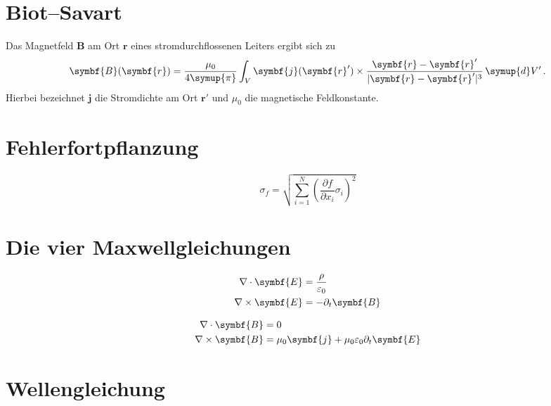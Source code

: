 \documentclass{scrartcl}
\begin{document}
\section{Biot--Savart}

Das Magnetfeld $\symbf{B}$ am Ort $\symbf{r}$ eines stromdurchflossenen Leiters
ergibt sich zu
\begin{equation*}
  \symbf{B}(\symbf{r}) = \frac{\mu_0}{4 \symup{\pi}}
    \int_V \symbf{j}(\symbf{r}') \times
      \frac{\symbf{r} - \symbf{r}'}{\lvert \symbf{r} - \symbf{r}' \rvert^3}
      \, \symup{d}V' \, .
\end{equation*}
Hierbei bezeichnet $\symbf{j}$ die Stromdichte am Ort $\symbf{r}'$ und $\mu_0$
die magnetische Feldkonstante.

\section{Fehlerfortpflanzung}

\begin{equation*}
  \sigma_f = \sqrt{
    \sum_{i = 1}^N
      \left( \frac{\partial f}{\partial x_i} \sigma_i \right)^{\!\! 2}
  }
\end{equation*}

\section{Die vier Maxwellgleichungen}

\begin{minipage}{.48\textwidth}
  \begin{align}
    \nabla \cdot \symbf{E} &= \frac{\rho}{\varepsilon_0} \\
    \addtocounter{equation}{+1}
    \nabla \times \symbf{E} &= - \partial_t \symbf{B}
  \end{align}
\end{minipage}
\hfill
\begin{minipage}{.48\textwidth}
  \begin{align}
    \addtocounter{equation}{-2}
    \nabla \cdot \symbf{B} &= 0 \\
    \addtocounter{equation}{+1}
    \nabla \times \symbf{B} &= \mu_0 \symbf{j} + \mu_0 \varepsilon_0 \partial_t \symbf{E}
  \end{align}
\end{minipage}

\section{Wellengleichung}
\end{document}
